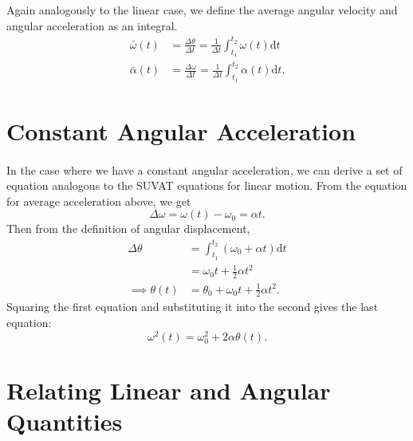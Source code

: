 \documentclass[../classical_mechanics.tex]{subfiles}
\begin{document}
        Again analogously to the linear case, we define the average angular velocity and angular acceleration as an integral.
        \begin{align}
            \bar{\omega}(t)&=\frac{\Delta\theta}{\Delta t}=\frac{1}{\Delta t}\int_{t_1}^{t_2}\omega(t)\mathrm{d}t\\
            \bar{\alpha}(t)&=\frac{\Delta\omega}{\Delta t}=\frac{1}{\Delta t}\int_{t_1}^{t_2}\alpha(t)\mathrm{d}t.
        \end{align}

    \section{Constant Angular Acceleration}
        \paragraph{}
        In the case where we have a constant angular acceleration, we can derive a set of equation analogous to the SUVAT equations for linear motion.
        From the equation for average acceleration above, we get
        \begin{equation}
            \Delta\omega=\omega(t)-\omega_0=\alpha t.
        \end{equation}
        Then from the definition of angular displacement,
        \begin{align}
            \Delta\theta&=\int_{t_1}^{t_2}(\omega_0+\alpha t)\mathrm{d}t\\
            &=\omega_0t+\frac{1}{2}\alpha t^2\\
            \implies\theta(t)&=\theta_0+\omega_0t+\frac{1}{2}\alpha t^2.
        \end{align}
        Squaring the first equation and substituting it into the second gives the last equation:
        \begin{equation}
            \omega^2(t)=\omega_0^2+2\alpha\theta(t).
        \end{equation}

    \section{Relating Linear and Angular Quantities}
\end{document}
